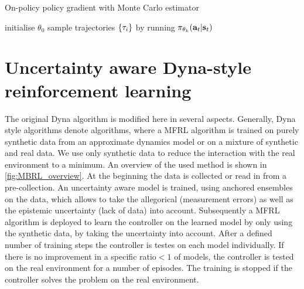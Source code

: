 \documentclass[
 reprint,
 amsmath,amssymb,amsfonts,clevref,
 aps,
prstab,
]{revtex4-2}
\begin{document}
\begin{algorithm}[ht]
\caption{On-policy policy gradient with Monte Carlo estimator \label{alg:pg}}
\begin{algorithmic}[1]
\State initialise $\theta_0$
\State sample trajectories $\{\tau_i\}$ by running $\pi_{\theta_k}(\mathbf{a}_t|\mathbf{s}_t)$ 
\end{algorithmic}
\end{algorithm}

\section{Uncertainty aware Dyna-style reinforcement learning}
The original Dyna algorithm \cite{Kurutach2018} is modified here in several aspects. Generally, Dyna style algorithms \cite{Sutton1991} denote algorithms, where a MFRL algorithm is trained on purely synthetic data from an approximate dynamics model or on a mixture of synthetic and real data. We use only synthetic data to reduce the interaction with the real environment to a minimum.
An overview of the used method is shown in \cref{fig:MBRL_overview}. At the beginning the data is collected or read in from a pre-collection. An uncertainty aware model is trained, using anchored ensembles \cite{Pearce2018} on the data, which allows to take the allegorical (measurement errors) as well as the epistemic uncertainty (lack of data) into account. Subsequently a MFRL algorithm is deployed to learn the controller on the learned model by only using the synthetic data, by taking the uncertainty into account. After a defined number of training steps the controller is testes on each model individually. If there is no improvement in a specific ratio$<1$ of models, the controller is tested on the real environment for a number of episodes. The training is stopped if the controller solves the problem on the real environment.
\end{document}
